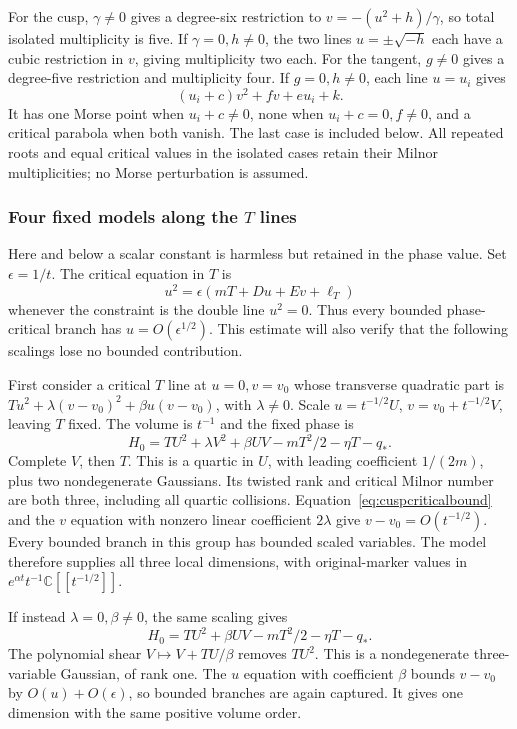 \documentclass[11pt]{article}
\theoremstyle{definition}\newtheorem{definition}[theorem]{Definition}
\theoremstyle{remark}\newtheorem{remark}[theorem]{Remark}
\newcommand{\C}{\mathbb C}
\begin{document}
For the cusp, $\gamma\ne0$ gives a degree-six restriction to
$v=-(u^2+h)/\gamma$, so total isolated multiplicity is five.
If $\gamma=0,h\ne0$, the two lines $u=\pm\sqrt{-h}$ each
have a cubic restriction in $v$, giving multiplicity two each.
For the tangent, $g\ne0$ gives a degree-five restriction and
multiplicity four. If $g=0,h\ne0$, each line $u=u_i$ gives
\[
 (u_i+c)v^2+fv+eu_i+k.
\]
It has one Morse point when $u_i+c\ne0$, none when
$u_i+c=0,f\ne0$, and a critical parabola when both vanish.
The last case is included below. All repeated roots and equal
critical values in the isolated cases retain their Milnor
multiplicities; no Morse perturbation is assumed.

\subsubsection*{Four fixed models along the $T$ lines}

Here and below a scalar constant is harmless but retained in the
phase value. Set $\epsilon=1/t$. The critical equation in $T$
is
\begin{equation}\label{eq:cuspcriticalbound}
 u^2=\epsilon(mT+Du+Ev+\ell_T)
\end{equation}
whenever the constraint is the double line $u^2=0$.
Thus every bounded phase-critical branch has $u=O(\epsilon^{1/2})$.
This estimate will also verify that the following scalings lose
no bounded contribution.

First consider a critical $T$ line at $u=0,v=v_0$ whose transverse
quadratic part is $Tu^2+\lambda(v-v_0)^2+\beta u(v-v_0)$,
with $\lambda\ne0$. Scale $u=t^{-1/2}U$,
$v=v_0+t^{-1/2}V$, leaving $T$ fixed. The volume is $t^{-1}$
and the fixed phase is
\[
 H_0=TU^2+\lambda V^2+\beta UV-mT^2/2-\eta T-q_*.
\]
Complete $V$, then $T$. This is a quartic in $U$, with leading
coefficient $1/(2m)$, plus two nondegenerate Gaussians. Its
twisted rank and critical Milnor number are both three, including
all quartic collisions. Equation~\eqref{eq:cuspcriticalbound}
and the $v$ equation with nonzero linear coefficient $2\lambda$
give $v-v_0=O(t^{-1/2})$. Every bounded branch in this group has
bounded scaled variables. The model therefore supplies all three
local dimensions, with original-marker values in
$e^{\alpha t}t^{-1}\C[[t^{-1/2}]]$.

If instead $\lambda=0,\beta\ne0$, the same scaling gives
\[
 H_0=TU^2+\beta UV-mT^2/2-\eta T-q_*.
\]
The polynomial shear $V\mapsto V+TU/\beta$ removes $TU^2$.
This is a nondegenerate three-variable Gaussian, of rank one.
The $u$ equation with coefficient $\beta$ bounds $v-v_0$ by
$O(u)+O(\epsilon)$, so bounded branches are again captured.
It gives one dimension with the same positive volume order.
\end{document}
